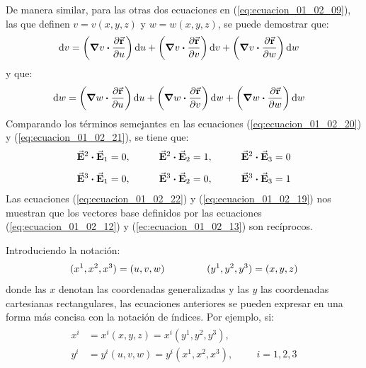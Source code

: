 \documentclass[hidelinks,12pt]{article}
\begin{document}
De manera similar, para las otras dos ecuaciones en (\ref{eq:ecuacion_01_02_09}), las que definen $v = v(x, y, z)$ y $w = w (x, y, z)$, se puede demostrar que:
\begin{align}
\dd{v} &= \left( \grad{v} \vdot \pdv{\va{r}}{u} \right) \dd{u} + \left( \grad{v} \vdot \pdv{\va{r}}{v} \right) \dd{v} + \left( \grad{v} \vdot \pdv{\va{r}}{w} \right) \dd{w}
\label{eq:ecuacion_01_02_20}
\end{align}
y que:
\begin{align}
\dd{w} &= \left( \grad{w} \vdot \pdv{\va{r}}{u} \right) \dd{u} + \left( \grad{w} \vdot \pdv{\va{r}}{v} \right) \dd{w} + \left( \grad{w} \vdot \pdv{\va{r}}{w} \right) \dd{w}
\label{eq:ecuacion_01_02_21}
\end{align}
Comparando los términos semejantes en las ecuaciones (\ref{eq:ecuacion_01_02_20}) y (\ref{eq:ecuacion_01_02_21}), se tiene que:
\begin{align}
\begin{aligned}
\va{E}^{2} \vdot \va{E}_{1} &= 0, \hspace{1cm} \va{E}^{2} \vdot \va{E}_{2} = 1, \hspace{1cm} \va{E}^{2} \vdot \va{E}_{3} = 0 \\[0.5em]
\va{E}^{3} \vdot \va{E}_{1} &= 0, \hspace{1cm} \va{E}^{3} \vdot \va{E}_{2} = 0, \hspace{1cm} \va{E}^{3} \vdot \va{E}_{3} = 1
\end{aligned}
\label{eq:ecuacion_01_02_22}
\end{align}
Las ecuaciones (\ref{eq:ecuacion_01_02_22}) y (\ref{eq:ecuacion_01_02_19}) nos muestran que los vectores base definidos por las ecuaciones (\ref{eq:ecuacion_01_02_12}) y (\ref{ec:ecuacion_01_02_13}) son recíprocos.
\par
Introduciendo la notación:
\begin{align}
(x^{1}, x^{2}, x^{3}) = (u, v, w) \hspace{1.5cm} (y^{1}, y^{2}, y^{3}) = (x, y, z)
\label{eq:ecuacion_01_02_23}
\end{align}
donde las $x$ denotan las coordenadas generalizadas y las $y$ las coordenadas cartesianas rectangulares, las ecuaciones anteriores se pueden expresar en una forma más concisa con la notación de índices. Por ejemplo, si:
\begin{align}
\begin{aligned}
x^{i} &= x^{i} (x, y, z) = x^{i} (y^{1}, y^{2}, y^{3}), \\[0.5em]
y^{i} &= y^{i} (u, v, w) = y^{i} (x^{1}, x^{2}, x^{3}), \hspace{1cm} i = 1, 2, 3
\end{aligned}
\label{ec:ecuacion_01_02_24}
\end{align}
\end{document}
